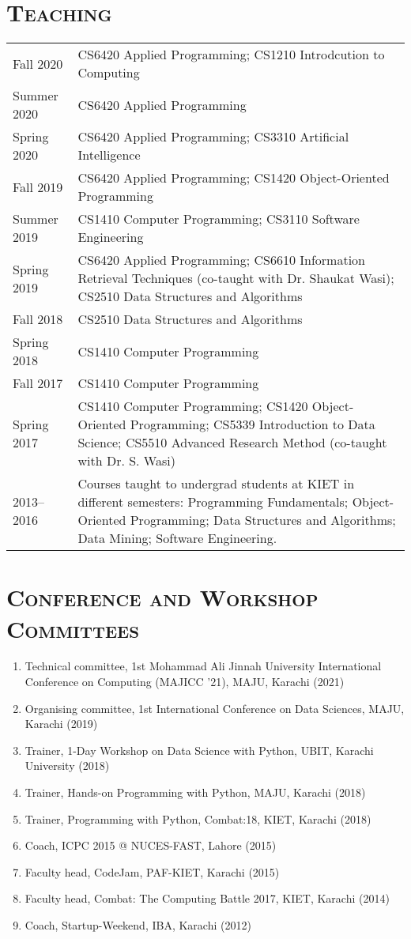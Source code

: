 \documentclass[a4paper, 10pt]{article}
\begin{document}
\section*{\normalfont\textsc{Teaching}}
{
\tabcolsep=4pt
\begin{tabular}{lp{16cm}}
Fall 2020 & CS6420 Applied Programming; CS1210 Introdcution to Computing\\
Summer 2020 & CS6420 Applied Programming \\
Spring 2020 & CS6420 Applied Programming; CS3310 Artificial Intelligence\\
Fall 2019 & CS6420 Applied Programming; CS1420 Object-Oriented Programming\\
Summer 2019 & CS1410 Computer Programming; CS3110 Software Engineering\\
Spring 2019 & CS6420 Applied Programming; CS6610 Information Retrieval Techniques (co-taught with Dr. Shaukat Wasi); CS2510 Data Structures and Algorithms\\
Fall 2018 & CS2510 Data Structures and Algorithms\\
Spring 2018 & CS1410 Computer Programming\\
Fall 2017 & CS1410 Computer Programming\\
Spring 2017 & CS1410 Computer Programming; CS1420 Object-Oriented Programming; CS5339 Introduction to Data Science; CS5510 Advanced Research Method (co-taught with Dr. S. Wasi)\\
2013--2016 & Courses taught to undergrad students at KIET in different semesters: Programming Fundamentals; Object-Oriented Programming; Data Structures and Algorithms; Data Mining; Software Engineering.
\end{tabular}
}

\section*{\normalfont\textsc{Conference and Workshop Committees}}
\begin{enumerate}
\itemsep-4pt
\item Technical committee, 1st Mohammad Ali Jinnah University International Conference on Computing (MAJICC '21), MAJU, Karachi (2021)
\item Organising committee, 1st International Conference on Data Sciences, MAJU, Karachi (2019)
\item Trainer, 1-Day Workshop on Data Science with Python, UBIT, Karachi University (2018)
\item  Trainer, Hands-on Programming with Python, MAJU, Karachi (2018)
\item  Trainer, Programming with Python, Combat:18, KIET, Karachi (2018)
\item  Coach, ICPC 2015 @ NUCES-FAST, Lahore (2015)
\item  Faculty head, CodeJam, PAF-KIET, Karachi (2015)
\item  Faculty head, Combat: The Computing Battle 2017, KIET, Karachi (2014)
\item  Coach, Startup-Weekend, IBA, Karachi (2012)
\end{enumerate}
\end{document}

